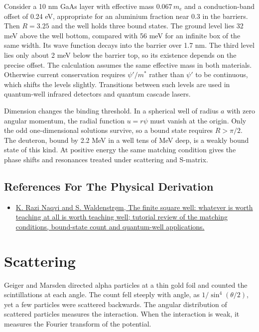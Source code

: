 \documentclass[11pt,oneside]{book}
\begin{document}
Consider a 10 nm GaAs layer with effective mass \(0.067\,m_e\) and a conduction-band offset of 0.24 eV, appropriate for an aluminium fraction near 0.3 in the barriers. Then \(R=3.25\) and the well holds three bound states. The ground level lies 32 meV above the well bottom, compared with 56 meV for an infinite box of the same width. Its wave function decays into the barrier over 1.7 nm. The third level lies only about 2 meV below the barrier top, so its existence depends on the precise offset. The calculation assumes the same effective mass in both materials. Otherwise current conservation requires \(\psi'/m^*\) rather than \(\psi'\) to be continuous, which shifts the levels slightly. Transitions between such levels are used in quantum-well infrared detectors and quantum cascade lasers.

Dimension changes the binding threshold. In a spherical well of radius \(a\) with zero angular momentum, the radial function \(u=r\psi\) must vanish at the origin. Only the odd one-dimensional solutions survive, so a bound state requires \(R>\pi/2\). The deuteron, bound by 2.2 MeV in a well tens of MeV deep, is a weakly bound state of this kind. At positive energy the same matching condition gives the phase shifts and resonances treated under scattering and S-matrix.

\subsection*{References For The Physical Derivation}
\begin{itemize}
\item \href{https://arxiv.org/abs/1505.03376}{K. Razi Naqvi and S. Waldenstrøm, The finite square well: whatever is worth teaching at all is worth teaching well; tutorial review of the matching conditions, bound-state count and quantum-well applications.}
\end{itemize}





\clearpage

\section{Scattering}

\label{topic:scattering}

Geiger and Marsden directed alpha particles at a thin gold foil and counted the scintillations at each angle. The count fell steeply with angle, as \(1/\sin^4(\theta/2)\), yet a few particles were scattered backwards. The angular distribution of scattered particles measures the interaction. When the interaction is weak, it measures the Fourier transform of the potential.
\end{document}
